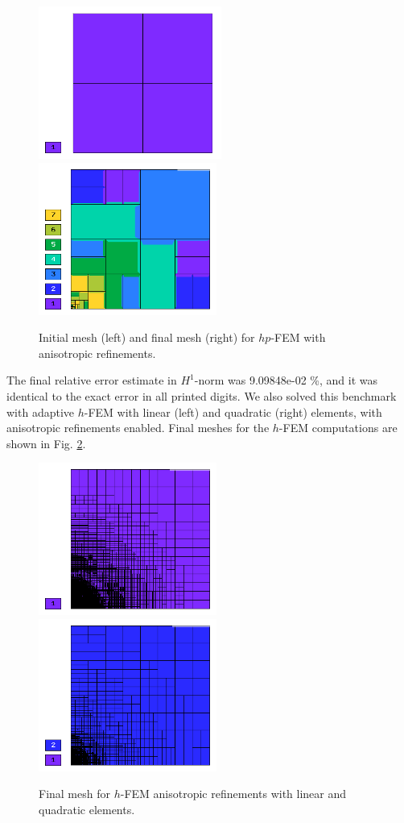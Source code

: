 \begin{figure}[!ht]
\centering
\includegraphics[height=5cm]{nist/nist-8/mesh_hp_aniso_init.png}\ \
\includegraphics[height=5cm]{nist/nist-8/mesh_hp_aniso.png}
\vspace{-2mm}
\caption{Initial mesh (left) and final mesh (right) for $hp$-FEM with anisotropic refinements.}
\label{fig:nist-8-hp-aniso}
\end{figure}

The final relative error estimate in $H^1$-norm was 9.09848e-02 \%,
and it was identical to the exact error in all printed digits.
We also solved this benchmark with adaptive $h$-FEM
with linear (left) and quadratic (right)
elements, with anisotropic refinements enabled.
Final meshes for the $h$-FEM computations are shown
in Fig. \ref{fig:nist-8-h-aniso}.

\begin{figure}[!ht]
\centering
\includegraphics[height=5cm]{nist/nist-8/mesh_h1_aniso.png}\ \
\includegraphics[height=5cm]{nist/nist-8/mesh_h2_aniso.png}
\vspace{-2mm}
\caption{Final mesh for $h$-FEM anisotropic refinements with linear and quadratic elements.}
\label{fig:nist-8-h-aniso}
\end{figure}

